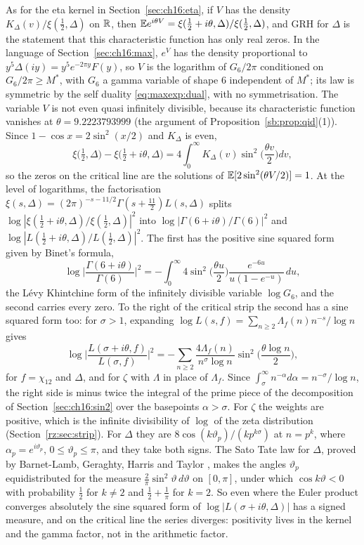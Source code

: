 As for the eta kernel in Section~\ref{sec:ch16:eta}, if $V$ has the density $K_\Delta(v)/\xi(\frac12,\Delta)$ on $\mathbb{R}$, then $\mathbb{E} e^{i\theta V}=\xi(\frac12+i\theta,\Delta)/\xi(\frac12,\Delta)$, and GRH for $\Delta$ is the statement that this characteristic function has only real zeros. In the language of Section~\ref{sec:ch16:max}, $e^V$ has the density proportional to $y^5\Delta(iy)=y^5e^{-2\pi y}F(y)$, so $V$ is the logarithm of $G_6/2\pi$ conditioned on $G_6/2\pi\ge M^*$, with $G_6$ a gamma variable of shape $6$ independent of $M^*$; its law is symmetric by the self duality \eqref{eq:maxexp:dual}, with no symmetrisation. The variable $V$ is not even quasi infinitely divisible, because its characteristic function vanishes at $\theta=9.2223793999$ (the argument of Proposition~\ref{sb:prop:qid}(1)). Since $1-\cos x=2\sin^2(x/2)$ and $K_\Delta$ is even,
\[
\xi\big(\tfrac12,\Delta\big)-\xi\big(\tfrac12+i\theta,\Delta\big)=4\int_0^\infty K_\Delta(v)\sin^2\Big(\frac{\theta v}2\Big)dv,
\]
so the zeros on the critical line are the solutions of $\mathbb{E}[2\sin^2(\theta V/2)]=1$. At the level of logarithms, the factorisation $\xi(s,\Delta)=(2\pi)^{-s-11/2}\Gamma(s+\frac{11}2)L(s,\Delta)$ splits $\log|\xi(\frac12+i\theta,\Delta)/\xi(\frac12,\Delta)|^2$ into $\log|\Gamma(6+i\theta)/\Gamma(6)|^2$ and $\log|L(\frac12+i\theta,\Delta)/L(\frac12,\Delta)|^2$. The first has the positive sine squared form given by Binet's formula,
\[
\log\Big|\frac{\Gamma(6+i\theta)}{\Gamma(6)}\Big|^2=-\int_0^\infty4\sin^2\Big(\frac{\theta u}2\Big)\frac{e^{-6u}}{u(1-e^{-u})}\,du,
\]
the L\'evy Khintchine form of the infinitely divisible variable $\log G_6$, and the second carries every zero. To the right of the critical strip the second has a sine squared form too: for $\sigma>1$, expanding $\log L(s,f)=\sum_{n\ge2}\Lambda_f(n)n^{-s}/\log n$ gives
\[
\log\Big|\frac{L(\sigma+i\theta,f)}{L(\sigma,f)}\Big|^2=-\sum_{n\ge2}\frac{4\Lambda_f(n)}{n^\sigma\log n}\sin^2\Big(\frac{\theta\log n}2\Big),
\]
for $f=\chi_{12}$ and $\Delta$, and for $\zeta$ with $\Lambda$ in place of $\Lambda_f$. Since $\int_\sigma^\infty n^{-\alpha}d\alpha=n^{-\sigma}/\log n$, the right side is minus twice the integral of the prime piece of the decomposition of Section~\ref{sec:ch16:sin2} over the basepoints $\alpha>\sigma$. For $\zeta$ the weights are positive, which is the infinite divisibility of $\log$ of the zeta distribution (Section~\ref{rz:sec:strip}). For $\Delta$ they are $8\cos(k\vartheta_p)/(kp^{k\sigma})$ at $n=p^k$, where $\alpha_p=e^{i\vartheta_p}$, $0\le\vartheta_p\le\pi$, and they take both signs. The Sato Tate law for $\Delta$, proved by Barnet-Lamb, Geraghty, Harris and Taylor \cite{BLGHT11}, makes the angles $\vartheta_p$ equidistributed for the measure $\frac2\pi\sin^2\vartheta\,d\vartheta$ on $[0,\pi]$, under which $\cos k\vartheta<0$ with probability $\frac12$ for $k\ne2$ and $\frac12+\frac1\pi$ for $k=2$. So even where the Euler product converges absolutely the sine squared form of $\log|L(\sigma+i\theta,\Delta)|$ has a signed measure, and on the critical line the series diverges: positivity lives in the kernel and the gamma factor, not in the arithmetic factor.

